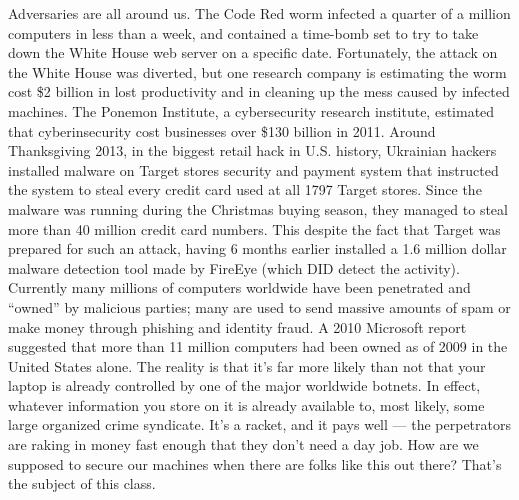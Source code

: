 \documentclass[11pt]{article}
\begin{document}
Adversaries are all around us. The Code Red worm infected a quarter of
a million computers in less than a week, and contained a time-bomb set
to try to take down the White House web server on a specific
date. Fortunately, the attack on the White House was diverted, but one
research company is estimating the worm cost \$2 billion in lost
productivity and in cleaning up the mess caused by infected machines.
The Ponemon Institute, a cybersecurity research institute, estimated
that cyberinsecurity cost businesses over \$130 billion in
2011. Around Thanksgiving 2013, in the biggest retail hack in
U.S. history, Ukrainian hackers installed malware on Target stores
security and payment system that instructed the system to steal every
credit card used at all 1797 Target stores.  Since the malware was
running during the Christmas buying season, they managed to steal more
than 40 million credit card numbers.  This despite the fact that
Target was prepared for such an attack, having 6 months earlier
installed a 1.6 million dollar malware detection tool made by FireEye
(which DID detect the activity).  Currently many millions of computers
worldwide have been penetrated and ``owned'' by malicious parties;
many are used to send massive amounts of spam or make money through
phishing and identity fraud.  A 2010 Microsoft report suggested that
more than 11 million computers had been owned as of 2009 in the United
States alone.  The reality is that it's far more likely than not that
your laptop is already controlled by one of the major worldwide
botnets.  In effect, whatever information you store on it is already
available to, most likely, some large organized crime syndicate.  It's
a racket, and it pays well --- the perpetrators are raking in money
fast enough that they don't need a day job. How are we supposed to
secure our machines when there are folks like this out there? That's
the subject of this class.
\end{document}
